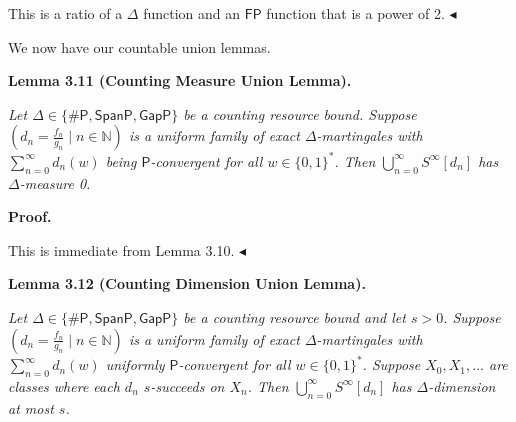 This is a ratio of a $\Delta$ function and an $\mathsf{FP}$ function that is a
power of 2.
$\blacktriangleleft$\par




We now have our countable union lemmas.\par





\par\medskip\noindent\textbf{
\textbf{Lemma 3.11}\textbf{ }(Counting Measure Union Lemma)\textbf{.}
}\par



\emph{Let $\Delta\in\{{\mathsf{\#}\mathsf{P}},\mathsf{SpanP},\mathsf{GapP}\}$ be a counting resource bound.
Suppose $\left(d_{n}=\frac{f_{n}}{g_{n}}\mid n\in\mathbb{N}\right)$ is a uniform family of
exact $\Delta$-martingales with $\sum\limits_{n=0}^{\infty}d_{n}(w)$ being $\mathsf{P}$-convergent for all $w\in\{0,1\}^{*}$.
Then $\bigcup\limits_{n=0}^{\infty}S^{\infty}[d_{n}]$ has $\Delta$-measure 0.}\par







\par\medskip\noindent\textbf{Proof.}\par




This is immediate from Lemma 3.10.
$\blacktriangleleft$\par





\par\medskip\noindent\textbf{
\textbf{Lemma 3.12}\textbf{ }(Counting Dimension Union Lemma)\textbf{.}
}\par



\emph{Let $\Delta\in\{{\mathsf{\#}\mathsf{P}},\mathsf{SpanP},\mathsf{GapP}\}$ be a counting resource bound and let $s>0$.
Suppose $\left(d_{n}=\frac{f_{n}}{g_{n}}\mid n\in\mathbb{N}\right)$ is a uniform family of
exact $\Delta$-martingales with $\sum\limits_{n=0}^{\infty}d_{n}(w)$ uniformly
$\mathsf{P}$-convergent for all $w\in\{0,1\}^{*}$. Suppose $X_{0},X_{1},\ldots$ are classes where each $d_{n}$ $s$-succeeds on $X_{n}$.
Then $\bigcup\limits_{n=0}^{\infty}S^{\infty}[d_{n}]$
has $\Delta$-dimension at most $s$.}\par



